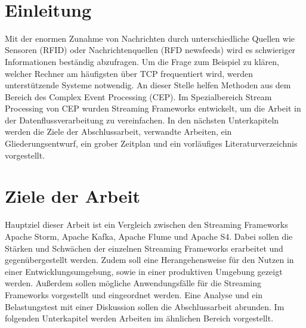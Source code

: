 \documentclass[11pt, a4paper]{book}
\begin{document}
\maketitle
~
\newpage

\pagestyle{empty}
\clearpage{}
\clearpage{}
\pagestyle{fancy}
\setcounter{page}{1}
\setcounter{chapter}{1}

\vspace{10ex}


\section{Einleitung}
Mit der enormen Zunahme von Nachrichten durch unterschiedliche Quellen wie Sensoren (RFID) oder 
Nachrichtenquellen (RFD newsfeeds) wird es schwieriger Informationen beständig abzufragen. Um die
Frage zum Beispiel zu klären, welcher Rechner am häufigsten über TCP frequentiert wird, werden unterstützende 
Systeme notwendig. An dieser Stelle helfen Methoden aus dem Bereich des Complex Event Processing (CEP).
Im Spezialbereich Stream Processing von CEP wurden Streaming Frameworks entwickelt, 
um die Arbeit in der Datenflussverarbeitung zu vereinfachen. In den nächsten Unterkapiteln werden die Ziele der Abschlussarbeit,
verwandte Arbeiten, ein Gliederungsentwurf, ein grober Zeitplan und ein vorläufiges Literaturverzeichnis vorgestellt.



\section{Ziele der Arbeit}
Hauptziel dieser Arbeit ist ein Vergleich zwischen den Streaming Frameworks Apache Storm, Apache Kafka, Apache Flume und Apache S4. Dabei sollen die Stärken und Schwächen der einzelnen Streaming Frameworks erarbeitet und gegenübergestellt werden. Zudem soll eine Herangehensweise für den Nutzen in einer Entwicklungsumgebung, sowie in einer produktiven Umgebung gezeigt werden. Außerdem sollen mögliche Anwendungsfälle für die Streaming Frameworks vorgestellt und eingeordnet werden. Eine Analyse und ein Belastungstest mit einer Diskussion sollen die Abschlussarbeit abrunden. Im folgenden Unterkapitel werden Arbeiten im ähnlichen Bereich vorgestellt.
\end{document}
